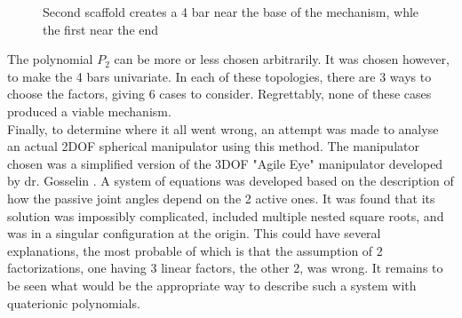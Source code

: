\begin{figure}[h!]
\begin{center}
\caption{Second scaffold creates a 4 bar near the base of the mechanism, whle the first near the end}
\label{}
\end{center}
\end{figure}

\clearpage
The polynomial $P_2$ can be more or less chosen arbitrarily. It was chosen however, to make the 4 bars univariate. In each of these topologies, there are 3 ways to choose the factors, giving 6 cases to consider. Regrettably, none of these cases produced a viable mechanism. 
\\
Finally, to determine where it all went wrong, an attempt was made to analyse an actual 2DOF spherical manipulator using this method. The manipulator chosen was a simplified version of the 3DOF "Agile Eye" manipulator developed by dr. Gosselin . 
A system of equations was developed based on the description of how the passive joint angles depend on the 2 active ones. It was found that its solution was impossibly complicated, included multiple nested square roots, and was in a singular configuration at the origin. This could have several explanations, the most probable of which is that the assumption of 2 factorizations, one having 3 linear factors, the other 2, was wrong. It remains to be seen what would be the appropriate way to describe such a system with quaterionic polynomials.

